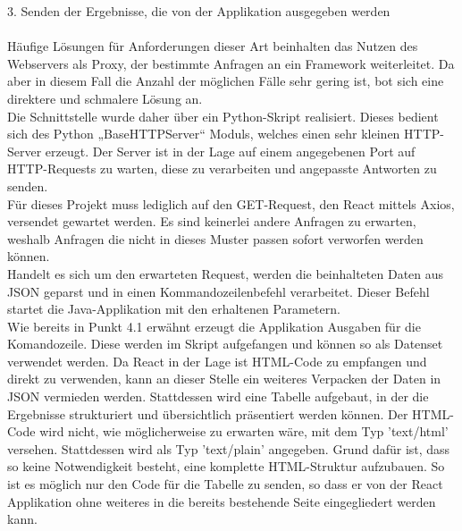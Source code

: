 3. Senden der Ergebnisse, die von der Applikation ausgegeben werden\\\\
Häufige Lösungen für Anforderungen dieser Art beinhalten das Nutzen des Webservers als Proxy, der bestimmte Anfragen an ein Framework weiterleitet. Da aber in diesem Fall die Anzahl der möglichen Fälle sehr gering ist, bot sich eine direktere und schmalere Lösung an.\\
Die Schnittstelle wurde daher über ein Python-Skript realisiert. Dieses bedient sich des Python „BaseHTTPServer“ Moduls, welches einen sehr kleinen HTTP-Server erzeugt. Der Server ist in der Lage auf einem angegebenen Port auf HTTP-Requests zu warten, diese zu verarbeiten und angepasste Antworten zu senden. \\
Für dieses Projekt muss lediglich auf den GET-Request, den React mittels Axios, versendet gewartet werden. Es sind keinerlei andere Anfragen zu erwarten, weshalb Anfragen die nicht in dieses Muster passen sofort verworfen werden können.\\
Handelt es sich um den erwarteten Request, werden die beinhalteten Daten aus JSON geparst und in einen Kommandozeilenbefehl verarbeitet. Dieser Befehl startet die Java-Applikation mit den erhaltenen Parametern.\\
Wie bereits in Punkt 4.1 erwähnt erzeugt die Applikation Ausgaben für die Komandozeile. Diese werden im Skript aufgefangen und können so als Datenset verwendet werden. Da React in der Lage ist HTML-Code zu empfangen und direkt zu verwenden, kann an dieser Stelle ein weiteres Verpacken der Daten in JSON vermieden werden. Stattdessen wird eine Tabelle aufgebaut, in der die Ergebnisse strukturiert und übersichtlich präsentiert werden können. Der HTML-Code wird nicht, wie möglicherweise zu erwarten wäre, mit dem Typ 'text/html' versehen. Stattdessen wird als Typ 'text/plain' angegeben. Grund dafür ist, dass so keine Notwendigkeit besteht, eine komplette HTML-Struktur aufzubauen. So ist es möglich nur den Code für die Tabelle zu senden, so dass er von der React Applikation ohne weiteres in die bereits bestehende Seite eingegliedert werden kann.
